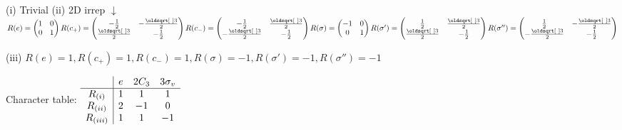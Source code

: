 \columnbreak
{}
\begin{squishlist}
    \item[(i)]
    Trivial \qquad  (ii) 2D irrep $\downarrow$ \\
    $R(e) = \begin{pmatrix} 1 & 0 \\ 0 & 1 \end{pmatrix}
    R(c_+) = \begin{pmatrix} -\frac{1}{2} & -\frac{\sqrt{3}}{2} \\\frac{\sqrt{3}}{2} & -\frac{1}{2} \end{pmatrix}
    R(c_-) = \begin{pmatrix} -\frac{1}{2} & \frac{\sqrt{3}}{2} \\-\frac{\sqrt{3}}{2} & -\frac{1}{2} \end{pmatrix} \\
    R(\sigma) = \begin{pmatrix} -1 & 0 \\ 0 & 1 \end{pmatrix}
    R(\sigma') = \begin{pmatrix} \frac{1}{2} & \frac{\sqrt{3}}{2} \\ \frac{\sqrt{3}}{2} & -\frac{1}{2} \end{pmatrix}
    R(\sigma'') = \begin{pmatrix} \frac{1}{2} & -\frac{\sqrt{3}}{2} \\ -\frac{\sqrt{3}}{2} & -\frac{1}{2} \end{pmatrix}$

    \item[(iii)] $R(e)=1,R(c_+)=1,R(c_-)=1,R(\sigma)=-1,R(\sigma')=-1,R(\sigma'')=-1$
    \item Character table:
    $\begin{array}{c | ccc}
         & e & 2C_3 & 3\sigma_v \\
         \hline
        R_{(i)} & 1 & 1 & 1 \\
        R_{(ii)} & 2 & -1 & 0 \\
        R_{(iii)} & 1 & 1 & -1    
    \end{array}$
\end{squishlist}

